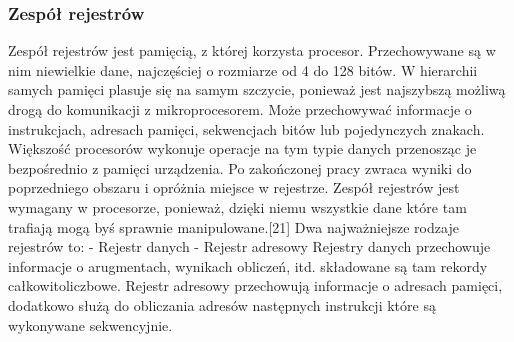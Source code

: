\documentclass[12pt, a4paper, onside, polish]{article}				%
\begin{document}
\subsubsection{Zespół rejestrów}
\hspace{\parindent}
Zespół rejestrów jest pamięcią, z której korzysta procesor. Przechowywane są w nim niewielkie dane, najczęściej o rozmiarze od 4 do 128 bitów. W hierarchii samych pamięci plasuje się na samym szczycie, ponieważ jest najszybszą możliwą drogą do komunikacji z mikroprocesorem. Może przechowywać informacje o instrukcjach, adresach pamięci, sekwencjach bitów lub pojedynczych znakach.  Większość procesorów wykonuje operacje na tym typie danych przenosząc je bezpośrednio z pamięci urządzenia. Po zakończonej pracy zwraca wyniki do poprzedniego obszaru i opróżnia miejsce w rejestrze. Zespół rejestrów jest wymagany w procesorze, ponieważ, dzięki niemu wszystkie dane które tam trafiają mogą byś sprawnie manipulowane.[21]  \newline\newline
Dwa najważniejsze rodzaje rejestrów to: \newline
- Rejestr danych \newline
- Rejestr adresowy \newline\newline
 Rejestry danych przechowuje informacje o arugmentach, wynikach obliczeń, itd.  składowane są tam rekordy całkowitoliczbowe.  \newline\newline
Rejestr adresowy przechowują informacje o adresach pamięci, dodatkowo służą do obliczania adresów następnych instrukcji które są wykonywane sekwencyjnie. 
\end{document}
